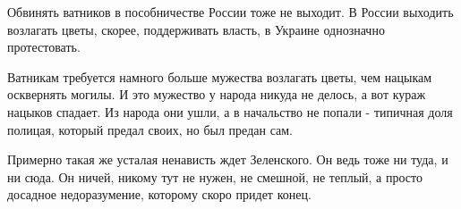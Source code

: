 Обвинять ватников в пособничестве России тоже не выходит. В России выходить
возлагать цветы, скорее, поддерживать власть, в Украине однозначно
протестовать. 

Ватникам требуется намного больше мужества возлагать цветы, чем нацыкам
осквернять могилы. И это мужество у народа никуда не делось, а вот кураж
нацыков спадает. Из народа они ушли, а в начальство не попали - типичная доля
полицая, который предал своих, но был предан сам. 

Примерно такая же усталая ненависть ждет Зеленского. Он ведь тоже ни туда, и ни
сюда. Он ничей, никому тут не нужен, не смешной, не теплый, а просто досадное
недоразумение, которому скоро придет конец.

